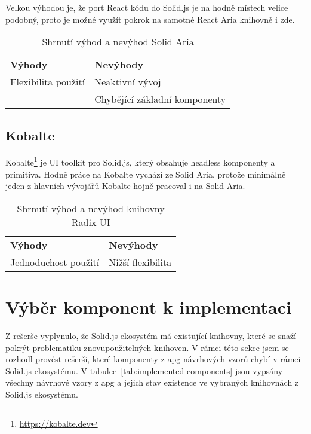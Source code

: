 Velkou výhodou je, že port React kódu do Solid.js je na hodně místech velice podobný, proto je možné využít pokrok na samotné React Aria knihovně i zde.

\begin{table}[ht]
    \begin{ctucolortab}
        \begin{tabularx}{\textwidth}{Y Y}
            \bfseries \textcolor{OK}{Výhody} & \bfseries \textcolor{NOT_OK}{Nevýhody} \\\Midrule{}
            Flexibilita použití              & Neaktivní vývoj                        \\
            ---                              & Chybějící základní komponenty
        \end{tabularx}
    \end{ctucolortab}
    \caption{Shrnutí výhod a nevýhod Solid Aria}
\end{table}

\subsection{Kobalte}

Kobalte\footnote{\url{https://kobalte.dev}} je UI toolkit pro Solid.js, který obsahuje headless komponenty a primitiva.
Hodně práce na Kobalte vychází ze Solid Aria, protože minimálně jeden z hlavních vývojářů Kobalte hojně pracoval i na Solid Aria.

\begin{table}[ht]
    \begin{ctucolortab}
        \begin{tabularx}{\textwidth}{Y Y}
            \bfseries \textcolor{OK}{Výhody} & \bfseries \textcolor{NOT_OK}{Nevýhody} \\\Midrule{}
            Jednoduchost použití             & Nižší flexibilita
        \end{tabularx}
    \end{ctucolortab}
    \caption{Shrnutí výhod a nevýhod knihovny Radix UI}
\end{table}

\section{Výběr komponent k implementaci}

Z rešerše vyplynulo, že Solid.js ekosystém má existující knihovny, které se snaží pokrýt problematiku znovupoužitelných knihoven.
V rámci této sekce jsem se rozhodl provést rešerši, které komponenty z \gls{apg} návrhových vzorů chybí v rámci Solid.js ekosystému.
V tabulce~\ref{tab:implemented-components} jsou vypsány všechny návrhové vzory z \gls{apg} a jejich stav existence ve vybraných knihovnách z Solid.js ekosystému.


